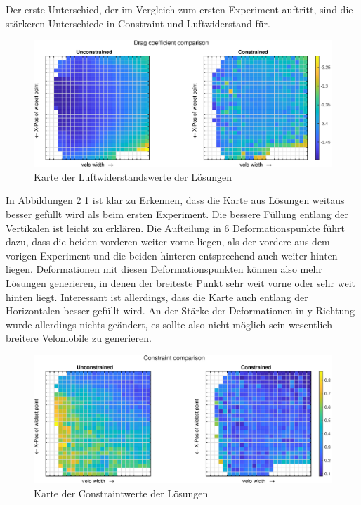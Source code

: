 Der erste Unterschied, der im Vergleich zum ersten Experiment auftritt, sind die stärkeren Unterschiede in Constraint und Luftwiderstand für.


\begin{figure}[h]
	\includegraphics[width=1\linewidth]{bilder/6pt500Samples/dragMapComparison}
	\caption{Karte der Luftwiderstandswerte der Lösungen}
	\label{fig:2ndmapDrag}
\end{figure}

In Abbildungen \cref{fig:2ndmapCon} \cref{fig:2ndmapDrag} ist klar zu Erkennen, dass die Karte aus Lösungen weitaus besser gefüllt wird als beim ersten Experiment.
Die bessere Füllung entlang der Vertikalen ist leicht zu erklären.
Die Aufteilung in 6 Deformationspunkte führt dazu, dass die beiden vorderen weiter vorne liegen, als der vordere aus dem vorigen Experiment und die beiden hinteren entsprechend auch weiter hinten liegen.
Deformationen mit diesen Deformationspunkten können also mehr Lösungen generieren, in denen der breiteste Punkt sehr weit vorne oder sehr weit hinten liegt.
Interessant ist allerdings, dass die Karte auch entlang der Horizontalen  besser gefüllt wird.
An der Stärke der Deformationen in y-Richtung wurde allerdings nichts geändert, es sollte also nicht möglich sein wesentlich breitere Velomobile zu generieren.

\begin{figure}[h]
	\includegraphics[width=1\linewidth]{bilder/6pt500Samples/constraintMapComparison}
	\caption{Karte der Constraintwerte der Lösungen}
	\label{fig:2ndmapCon}
\end{figure}

